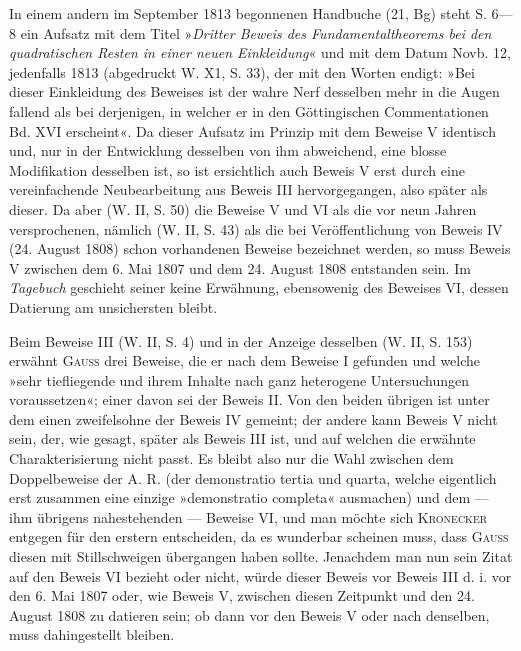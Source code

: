 In einem andern im September 1813 begonnenen Handbuche (21, Bg) steht S. 6—8 ein Aufsatz mit dem Titel »\textit{Dritter Beweis des Fundamentaltheorems bei den quadratischen Resten in einer neuen Einkleidung}« und mit dem Datum Novb. 12, jedenfalls 1813 (abgedruckt W. X1, S. 33), der mit den Worten endigt: »Bei dieser Einkleidung des Beweises ist der wahre Nerf desselben mehr in die Augen fallend als bei derjenigen, in welcher er in den Göttingischen Commentationen Bd. XVI erscheint«. Da dieser Aufsatz im Prinzip
\newpage{}
\noindent mit dem Beweise V identisch und, nur in der Entwicklung desselben von ihm abweichend, eine blosse Modifikation desselben ist, so ist ersichtlich auch Beweis V erst durch eine vereinfachende Neubearbeitung aus Beweis III hervorgegangen, also später als dieser. Da aber (W. II, S. 50) die Beweise V und VI als die vor neun Jahren versprochenen, nämlich (W. II, S. 43) als die bei Veröffentlichung von Beweis IV (24. August 1808) schon vorhandenen Beweise bezeichnet werden, so muss Beweis V zwischen dem 6. Mai 1807 und dem 24. August 1808 entstanden sein. Im \textit{Tagebuch} geschieht seiner keine Erwähnung, ebensowenig des Beweises VI, dessen Datierung am unsichersten bleibt.

Beim Beweise III (W. II, S. 4) und in der Anzeige desselben (W. II, S. 153) erwähnt \textsc{Gauss} drei Beweise, die er nach dem Beweise I gefunden und welche »sehr tiefliegende und ihrem Inhalte nach ganz heterogene Untersuchungen voraussetzen«; einer davon sei der Beweis II. Von den beiden übrigen ist unter dem einen zweifelsohne der Beweis IV gemeint; der andere kann Beweis V nicht sein, der, wie gesagt, später als Beweis III ist, und auf welchen die erwähnte Charakterisierung nicht passt. Es bleibt also nur die Wahl zwischen dem Doppelbeweise der A. R. (der demonstratio tertia und quarta, welche eigentlich erst zusammen eine einzige »demonstratio completa« ausmachen) und dem — ihm übrigens nahestehenden — Beweise VI, und man möchte sich \textsc{Kronecker} entgegen für den erstern entscheiden, da es wunderbar scheinen muss, dass \textsc{Gauss} diesen mit Stillschweigen übergangen haben sollte. Jenachdem man nun sein Zitat auf den Beweis VI bezieht oder nicht, würde dieser Beweis vor Beweis III d. i. vor den 6. Mai 1807 oder, wie Beweis V, zwischen diesen Zeitpunkt und den 24. August 1808 zu datieren sein; ob dann vor den Beweis V oder nach denselben, muss dahingestellt bleiben.

